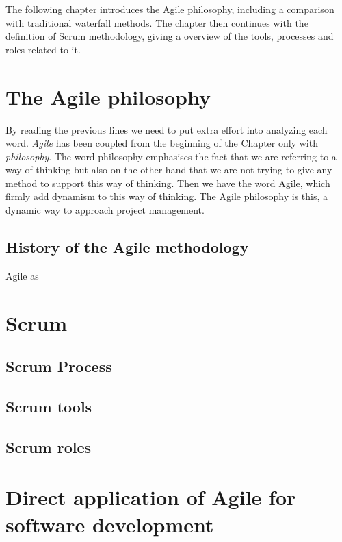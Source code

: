 \documentclass[../main.tex]{subfiles}
\begin{document}
The following chapter introduces the Agile philosophy, including a comparison with traditional waterfall methods. The chapter then continues with the definition of Scrum methodology, giving a overview of the tools, processes and roles related to it. 
\section{The Agile philosophy}
By reading the previous lines we need to put extra effort into analyzing each word. 
\textit{Agile} has been coupled from the beginning of the Chapter only with \textit{philosophy}.  
The word philosophy emphasises the fact that we are referring to a way of thinking but also on the other hand that we are not trying to give any method to support this way of thinking. Then we have the word Agile, which firmly add dynamism to this way of thinking. 
The Agile philosophy is this, a dynamic way to approach project management. 
\subsection{History of the Agile methodology}
Agile as \cite{inproceedings}


\section{Scrum}
\subsection{Scrum Process}
\subsection{Scrum tools}
\subsection{Scrum roles}
\section{Direct application of Agile for software development}
\cleardoublepage
\end{document}
